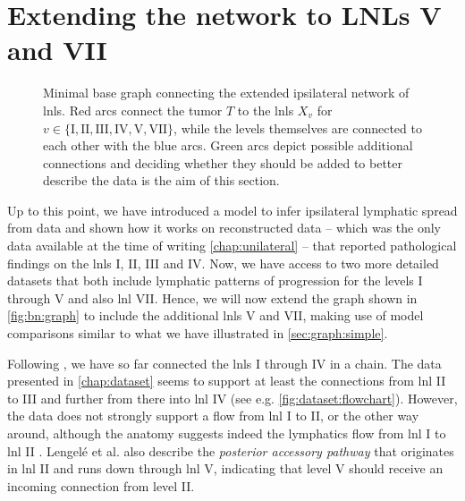 \documentclass[\relativeRoot/main.tex]{subfiles}
\begin{document}
\section{Extending the network to LNLs V and VII}
\label{sec:graph:extended}

\begin{figure}
    \centering
    \def\svgwidth{0.4\textwidth}
    
    \caption[
        Base graph of the extended ipsilateral model with possible additional edges
    ]{
        Minimal base graph connecting the extended ipsilateral network of \glspl{lnl}. Red arcs connect the tumor $T$ to the \glspl{lnl} $X_v$ for $v \in \{ \text{I}, \text{II}, \text{III}, \text{IV}, \text{V}, \text{VII} \}$, while the levels themselves are connected to each other with the blue arcs. Green arcs depict possible additional connections and deciding whether they should be added to better describe the data is the aim of this section.
    }
    \label{fig:graph:extended_graph}
\end{figure}

Up to this point, we have introduced a model to infer ipsilateral lymphatic spread from data and shown how it works on reconstructed data -- which was the only data available at the time of writing \cref{chap:unilateral} -- that reported pathological findings on the \glspl{lnl} I, II, III and IV. Now, we have access to two more detailed datasets that both include lymphatic patterns of progression for the levels I through V and also \gls{lnl} VII. Hence, we will now extend the graph shown in \cref{fig:bn:graph} to include the additional \glspl{lnl} V and VII, making use of model comparisons similar to what we have illustrated in \cref{sec:graph:simple}.

Following \cite{pouymayou_bayesian_2019}, we have so far connected the \glspl{lnl} I through IV in a chain. The data presented in \cref{chap:dataset} seems to support at least the connections from \gls{lnl} II to III and further from there into \gls{lnl} IV (see e.g. \cref{fig:dataset:flowchart}). However, the data does not strongly support a flow from \gls{lnl} I to II, or the other way around, although the anatomy suggests indeed the lymphatics flow from \gls{lnl} I to \gls{lnl} II \cite{lengele_anatomical_2007}. Lengelé et al. \cite{lengele_anatomical_2007} also describe the \emph{posterior accessory pathway} that originates in \gls{lnl} II and runs down through \gls{lnl} V, indicating that level V should receive an incoming connection from level II.
\end{document}
